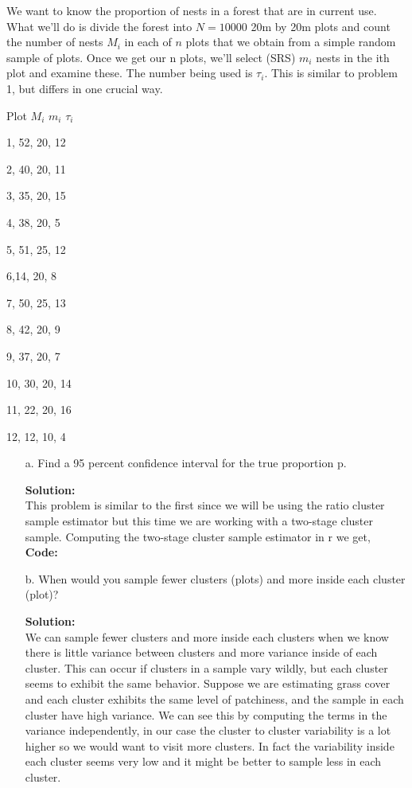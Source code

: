 \documentclass[12pt]{article}
\makeatletter
\theoremstyle{homework}
\newenvironment{exercise}[1]
{\def\@currentlabel{#1}\exercisecore}
{\endexercisecore}
\newcommand{\localhead}[1]{\par\smallskip\noindent\textbf{#1}\nobreak\\}%
\newcommand\solution{\localhead{Solution:}}
\makeatother
\begin{document}
\begin{exercise}{3} We want to know the proportion of nests in a forest that are in current use. 
  What we’ll do is divide the forest into $N = 10000$ 20m by 20m plots and count the number 
  of nests $M_i$ in each of $n$ plots that we obtain from a simple random sample of plots. 
  Once we get our n plots, we’ll select (SRS) $m_i$ nests in the ith plot and examine these. 
  The number being used is $\tau_i$. This is similar to problem 1, but differs in one crucial way.

  Plot $M_i$ $m_i$ $\tau_i$
  
  1, 52, 20, 12 
  
  2, 40, 20, 11 
  
  3, 35, 20, 15 
  
  4, 38, 20, 5 
  
  5, 51, 25, 12
  
  6,14, 20, 8
  
  7, 50, 25, 13 
  
  8, 42, 20, 9 
  
  9, 37, 20, 7 
  
  10, 30, 20, 14 
  
  11, 22, 20, 16 
  
  12, 12, 10, 4
  
\begin{enumerate}
  \item[a.]Find a 95 percent confidence interval for the true proportion p.\\
  \solution This problem is similar to the first since we will be using the ratio cluster sample estimator but 
  this time we are working with a two-stage cluster sample. Computing the two-stage cluster sample estimator in r we get,\\
  \textbf{Code:}
\begin{center}
   
\end{center}




  \item[b.]When would you sample fewer clusters (plots) and more inside each cluster (plot)?\\
  \solution We can sample fewer clusters and more inside each clusters when we know there is little variance 
  between clusters and more variance inside of each cluster. This can occur if clusters in a sample vary wildly, but each cluster seems 
  to exhibit the same behavior. Suppose we are estimating grass cover and each cluster exhibits the same level of patchiness, and the sample in each 
  cluster have high variance. We can see this by computing the terms in the variance independently, in our case the cluster to cluster variability is a lot higher
  so we would want to visit more clusters. In fact the variability inside each cluster seems very low and it might be better to sample less in each cluster.
\end{enumerate} 
\end{exercise}
\vspace{1in}
\end{document}
